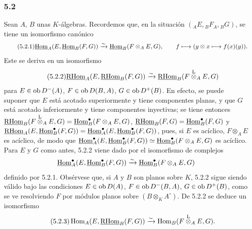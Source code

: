 \subsubsection*{5.2}

Sean $A$, $B$ unas $K$-álgebras. Recordemos que, en la situación $({}_AE,{}_BF_A,{}_BG)$, se tiene un isomorfismo canónico
\begin{equation}\tag{5.2.1}
\underline{\operatorname{Hom}}_A(E,\underline{\operatorname{Hom}}_B(F,G))\xrightarrow{\sim}\underline{\operatorname{Hom}}_B(F\otimes_AE,G),\qquad
f\longmapsto (y\otimes x\longmapsto f(x)(y)).
\end{equation}
Este se deriva en un isomorfismo
\begin{equation}\tag{5.2.2}
\underline{\mathrm{RHom}}_A(E,\underline{\mathrm{RHom}}_B(F,G))\xrightarrow{\sim}\underline{\mathrm{RHom}}_B(F\overset{\mathrm L}{\otimes}_AE,G)
\end{equation}
para $E\in\operatorname{ob} D^-(A)$, $F\in\operatorname{ob} D(B,A)$, $G\in\operatorname{ob} D^+(B)$. En efecto, se puede suponer que $E$ está acotado superiormente y tiene componentes planas, y que $G$ está acotado inferiormente y tiene componentes inyectivas; se tiene entonces $\underline{\mathrm{RHom}}_B(F\overset{\mathrm L}{\otimes}_AE,G)=\underline{\operatorname{Hom}}_B^\bullet(F\otimes_AE,G)$, $\underline{\mathrm{RHom}}_B(F,G)=\underline{\operatorname{Hom}}_B^\bullet(F,G)$ y $\underline{\mathrm{RHom}}_A(E,\underline{\operatorname{Hom}}_B^\bullet(F,G))=\underline{\operatorname{Hom}}_A^\bullet(E,\underline{\operatorname{Hom}}_B^\bullet(F,G))$, pues, si $E$ es acíclico, $F\otimes_AE$ es acíclico, de modo que $\underline{\operatorname{Hom}}_A^\bullet(E,\underline{\operatorname{Hom}}_B^\bullet(F,G))\simeq\underline{\operatorname{Hom}}_B^\bullet(F\otimes_AE,G)$ es acíclico. Para $E$ y $G$ como antes, 5.2.2 viene dado por el isomorfismo de complejos
\[
\underline{\operatorname{Hom}}_A^\bullet(E,\underline{\operatorname{Hom}}_B^\bullet(F,G))\xrightarrow{\sim}\underline{\operatorname{Hom}}_B^\bullet(F\otimes_AE,G)
\]
definido por 5.2.1. Obsérvese que, si $A$ y $B$ son planos sobre $K$, 5.2.2 sigue siendo válido bajo las condiciones $E\in\operatorname{ob} D(A)$, $F\in\operatorname{ob} D^-(B,A)$, $G\in\operatorname{ob} D^+(B)$, como se ve resolviendo $F$ por módulos planos sobre $(B\otimes_KA^\circ)$. De 5.2.2 se deduce un isomorfismo
\begin{equation}\tag{5.2.3}
\operatorname{Hom}_A(E,\underline{\mathrm{RHom}}_B(F,G))\xrightarrow{\sim}\operatorname{Hom}_B(F\overset{\mathrm L}{\otimes}_AE,G).
\end{equation}
